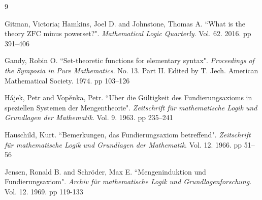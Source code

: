 \documentclass[11pt, a4paper]{article}
\newcounter{Theor1}
\newcounter{Ex1}
\begin{document}
\begin{thebibliography}{9}



 Gitman, Victoria; Hamkins, Joel D. and Johnstone, Thomas A. ``What is the theory $\mathrm{ZFC}$ minus powerset?". {\it Mathematical Logic Quarterly}. Vol. 62. 2016. pp 391--406

 Gandy, Robin O. ``Set-theoretic functions for elementary syntax". {\it Proceedings of the Symposia in Pure Mathematics}. No. 13. Part II. Edited by T. Jech. American Mathematical Society. 1974. pp 103--126


 H\'{a}jek, Petr and Vop\v{e}nka, Petr. ``Uber die G\"{u}ltigkeit des Fundierungsaxioms in speziellen Systemen der Mengentheorie". {\it Zeitschrift f\"{u}r mathematische Logik und Grundlagen der Mathematik}. Vol. 9. 1963. pp 235--241

 Hauschild, Kurt. ``Bemerkungen, das Fundierungsaxiom betreffend". {\it Zeitschrift f\"{u}r mathematische Logik und Grundlagen der Mathematik}. Vol. 12. 1966. pp 51--56


 Jensen, Ronald B. and Schr\"{o}der, Max E. ``Mengeninduktion und Fundierungsaxiom". {\it Archiv f\"{u}r mathematische Logik und Grundlagenforschung}. Vol. 12. 1969. pp 119-133



\end{thebibliography}
\end{document}
